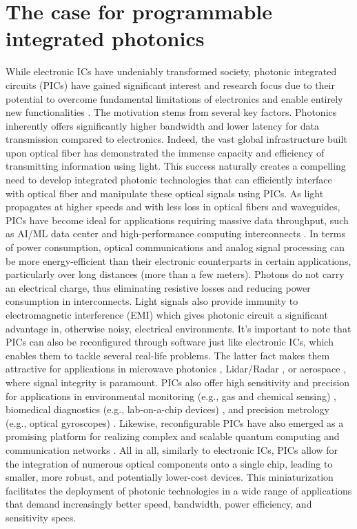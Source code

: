 \section{The case for programmable integrated photonics} \label{sec:photonics_motivation}

While electronic ICs have undeniably transformed society, photonic integrated circuits (PICs) have gained significant interest and research focus due to their potential to overcome fundamental limitations of electronics and enable entirely new functionalities \cite{soref_past_2006,ye_review_2013,baets_silicon_2017}.
The motivation stems from several key factors.
Photonics inherently offers significantly higher bandwidth and lower latency for data transmission compared to electronics.
Indeed, the vast global infrastructure built upon optical fiber has demonstrated the immense capacity and efficiency of transmitting information using light.
This success naturally creates a compelling need to develop integrated photonic technologies that can efficiently interface with optical fiber and manipulate these optical signals using PICs.
As light propagates at higher speeds and with less loss in optical fibers and waveguides, PICs have become ideal for applications requiring massive data throughput, such as AI/ML data center and high-performance computing interconnects \cite{khani_sip-ml_2021,li_silicon_2015,zhou_development_2018}.
In terms of power consumption, optical communications and analog signal processing can be more energy-efficient than their electronic counterparts in certain applications, particularly over long distances (more than a few meters).
Photons do not carry an electrical charge, thus eliminating resistive losses and reducing power consumption in interconnects.
Light signals also provide immunity to electromagnetic interference (EMI) which gives photonic circuit a significant advantage in, otherwise noisy, electrical environments.
It's important to note that PICs can also be reconfigured through software just like electronic ICs, which enables them to tackle several real-life problems.
The latter fact makes them attractive for applications in microwave photonics \cite{chen_silicon_2017,marpaung_integrated_2019}, Lidar/Radar \cite{hashemi_review_2022,serafino_toward_2019}, or aerospace \cite{hsu_free-space_2022}, where signal integrity is paramount.
PICs also offer high sensitivity and precision for applications in environmental monitoring (e.g., gas and chemical sensing) \cite{chrostowski_silicon_2012}, biomedical diagnostics (e.g., lab-on-a-chip devices) \cite{fathpour_silicon_2011}, and precision metrology (e.g., optical gyroscopes) \cite{weimann_silicon_2017,khial_nanophotonic_2018}.
Likewise, reconfigurable PICs have also emerged as a promising platform for realizing complex and scalable quantum computing and communication networks \cite{harris_large-scale_2016,sibson_integrated_2017}.
All in all, similarly to electronic ICs, PICs allow for the integration of numerous optical components onto a single chip, leading to smaller, more robust, and potentially lower-cost devices.
This miniaturization facilitates the deployment of photonic technologies in a wide range of applications that demand increasingly better speed, bandwidth, power efficiency, and sensitivity specs.

